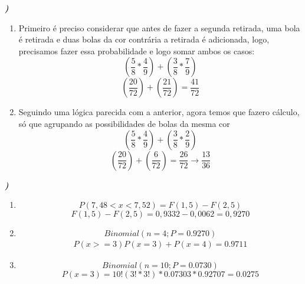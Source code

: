 \documentclass[12pt]{article}
\newcounter{instn}
\newcommand{\instnum}{\arabic{instn}}
\newcommand{\myline}[1]{
    \emph{\textbf{#1)}}
    \addtocounter{instn}{1}
}
\newenvironment{question}
 {
    \myline{\instnum} 
    }
    {
 }
\begin{document}
    \newpage
    \begin{question}
        \begin{enumerate}[label={\textbf{\alph*)}}]
            \item Primeiro é preciso considerar que antes de fazer a segunda 
            retirada, uma bola é retirada e duas bolas da cor contrária a retirada é adicionada,
            logo, precisamos fazer essa probabilidade e logo somar ambos os casos: 
            \[
                (\frac{5}{8} * \frac{4}{9}) + (\frac{3}{8} * \frac{7}{9})  
            \]
            \begin{equation}
                (\frac{20}{72}) + (\frac{21}{72}) = \frac{41}{72}
            \end{equation}
            \item Seguindo uma lógica parecida com a anterior, agora temos que fazero cálculo, só que 
            agrupando as possibilidades de bolas da mesma cor 
            \[
                (\frac{5}{8} * \frac{4}{9}) + (\frac{3}{8} * \frac{2}{9})  
            \]
            \begin{equation}
                (\frac{20}{72}) + (\frac{6}{72}) = \frac{26}{72} \rightarrow \frac{13}{36}
            \end{equation}
        \end{enumerate}
    \end{question}


    \begin{question}

        \begin{enumerate}[label={\textbf{\alph*)}}]
            \item 
            \[
                P (7,48 < x < 7,52) = F(1,5) - F(2,5) 
            \]
            \[
                F(1,5) - F(2,5) = 0,9332 - 0,0062 = 0,9270
            \]

            \item 
            \[
                Binomial(n = 4; P= 0.9270)
            \]
            \begin{align*}
                P(x >= 3) P(x=3) + P(x=4) = 0.9711 
            \end{align*}
            \item 
            \[
                Binomial(n = 10; P= 0.0730)
            \]
            \begin{equation}
                P(x = 3) = 10!(3!*3!)*0.07303*0.92707 = 0.0275 
            \end{equation}
        \end{enumerate}
        
    \end{question}
\end{document}
